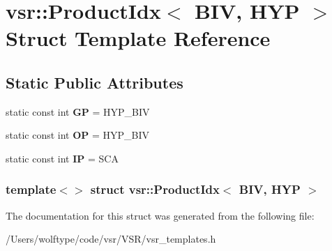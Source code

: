 \hypertarget{structvsr_1_1_product_idx_3_01_b_i_v_00_01_h_y_p_01_4}{\section{vsr\-:\-:Product\-Idx$<$ B\-I\-V, H\-Y\-P $>$ Struct Template Reference}
\label{structvsr_1_1_product_idx_3_01_b_i_v_00_01_h_y_p_01_4}
}
\subsection*{Static Public Attributes}
\begin{DoxyCompactItemize}
\item 
\hypertarget{structvsr_1_1_product_idx_3_01_b_i_v_00_01_h_y_p_01_4_ab19ab3098687012237cf6892da9394e7}{static const int {\bfseries G\-P} = H\-Y\-P\-\_\-\-B\-I\-V}\label{structvsr_1_1_product_idx_3_01_b_i_v_00_01_h_y_p_01_4_ab19ab3098687012237cf6892da9394e7}

\item 
\hypertarget{structvsr_1_1_product_idx_3_01_b_i_v_00_01_h_y_p_01_4_a4274c40082c6b6b24e246f1e0fa755cc}{static const int {\bfseries O\-P} = H\-Y\-P\-\_\-\-B\-I\-V}\label{structvsr_1_1_product_idx_3_01_b_i_v_00_01_h_y_p_01_4_a4274c40082c6b6b24e246f1e0fa755cc}

\item 
\hypertarget{structvsr_1_1_product_idx_3_01_b_i_v_00_01_h_y_p_01_4_a9db0a22be91d2f4fcdbb22838449dbc8}{static const int {\bfseries I\-P} = S\-C\-A}\label{structvsr_1_1_product_idx_3_01_b_i_v_00_01_h_y_p_01_4_a9db0a22be91d2f4fcdbb22838449dbc8}

\end{DoxyCompactItemize}
\subsubsection*{template$<$$>$ struct vsr\-::\-Product\-Idx$<$ B\-I\-V, H\-Y\-P $>$}



The documentation for this struct was generated from the following file\-:\begin{DoxyCompactItemize}
\item 
/\-Users/wolftype/code/vsr/\-V\-S\-R/vsr\-\_\-templates.\-h\end{DoxyCompactItemize}
